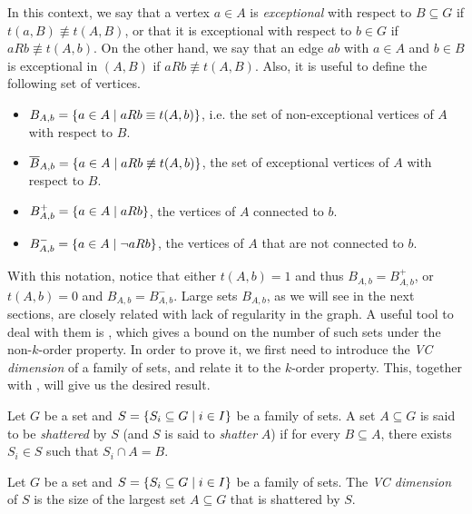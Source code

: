     In this context, we say that a vertex $a \in A$ is \emph{exceptional} with respect to $B \subseteq G$ if $t(a,B) \not\equiv t(A,B)$,
    or that it is exceptional with respect to $b \in G$ if $a R b \not\equiv t(A,b)$.
    On the other hand, we say that an edge $ab$ with $a \in A$ and $b \in B$ is exceptional in $(A,B)$ if $a R b \not\equiv t(A,B)$.
    Also, it is useful to define the following set of vertices.
    \begin{itemize}
        \item $B_{A,b} = \{ a \in A \mid a R b \equiv t(A,b) \}$, i.e. the set of non-exceptional vertices of $A$
            with respect to $B$.
        \item $\overline{B}_{A,b} = \{ a \in A \mid a R b \not\equiv t(A,b) \}$, the set of exceptional vertices of $A$ with
            respect to $B$.
        \item $B^+_{A,b} = \{ a \in A \mid a R b \}$, the vertices of $A$ connected to $b$.
        \item $B^-_{A,b} = \{ a \in A \mid \neg a R b \}$, the vertices of $A$ that are not connected to $b$.
    \end{itemize}
    With this notation, notice that either $t(A,b) = 1$ and thus $B_{A,b} = B^+_{A,b}$, or $t(A,b) = 0$ and $B_{A,b} = B^-_{A,b}$.
    Large sets $B_{A,b}$, as we will see in the next sections, are closely related with lack of regularity in the graph.
    A useful tool to deal with them is , which gives a bound on the number of such sets under the
    non-$k$-order property.
    In order to prove it, we first need to introduce the \emph{VC dimension} of a family of sets, and relate it to the
    $k$-order property.
    This, together with , will give us the desired result.

    \begin{definition} \label{def:shattered}
        Let $G$ be a set and $S = \{ S_i \subseteq G \mid i \in I \}$ be a family of sets.
        A set $A \subseteq G$ is said to be \emph{shattered} by $S$ (and $S$ is said to \emph{shatter} $A$) if
        for every $B \subseteq A$, there exists $S_i \in S$ such that $S_i \cap A = B$.
    \end{definition}

    \begin{definition} \label{def:VC_dimension}
        Let $G$ be a set and $S = \{ S_i \subseteq G \mid i \in I \}$ be a family of sets.
        The \emph{VC dimension} of $S$ is the size of the largest set $A \subseteq G$ that is shattered by $S$.
    \end{definition}

